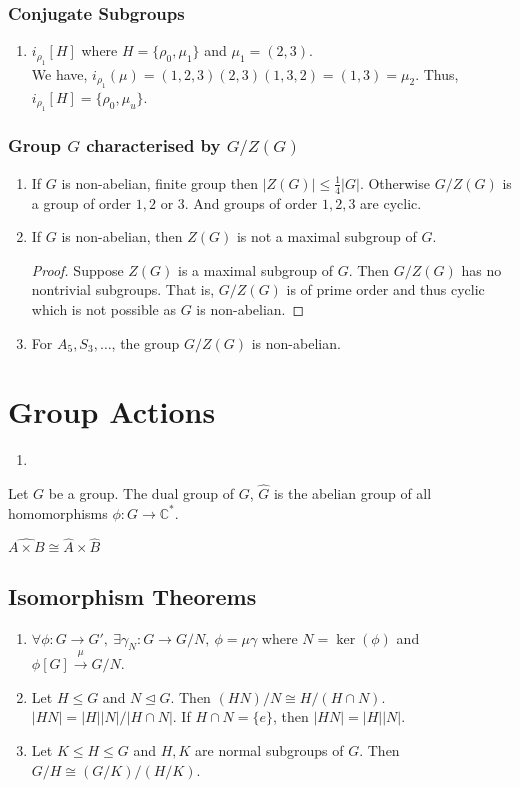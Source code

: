 \subsubsection{Conjugate Subgroups}
\begin{enumerate}
	\item $i_{\rho_1}[H]$ where $H = \{ \rho_0, \mu_1 \}$ and $\mu_1 = (2,3)$.\\
	We have, $i_{\rho_1}(\mu) = (1,2,3)(2,3)(1,3,2)=(1,3) = \mu_2$.
	Thus, $i_{\rho_1}[H] = \{ \rho_0, \mu_u \}$.
\end{enumerate}

\subsubsection{Group $G$ characterised by $G/Z(G)$}
\begin{enumerate}
	\item If $G$ is non-abelian, finite group then $|Z(G)| \le \frac{1}{4}|G|$. Otherwise $G/Z(G)$ is a group of order $1,2$ or $3$. And groups of order $1,2,3$ are cyclic.
	\item If $G$ is non-abelian, then $Z(G)$ is not a maximal subgroup of $G$.
	\begin{proof}
		Suppose $Z(G)$ is a maximal subgroup of $G$.
		Then $G/Z(G)$ has no nontrivial subgroups.
		That is, $G/Z(G)$ is of prime order and thus cyclic which is not possible as $G$ is non-abelian.
	\end{proof}
	\item For $A_5,S_3,\dots$, the group $G/Z(G)$ is non-abelian.
\end{enumerate}

\section{Group Actions}
\begin{enumerate}
	\item 
\end{enumerate}

\begin{definition}
	Let $G$ be a group. The dual group of $G$, $\hat{G}$ is the abelian group of all homomorphisms $\phi : G \to \mathbb{C}^\ast$.
\end{definition}
	$\widehat{A \times B} \cong \hat{A} \times \hat{B}$

\subsection{Isomorphism Theorems}
\begin{enumerate}
	\item $\forall \phi : G \to G',\ \exists \gamma_N : G \to G/N,\ \phi = \mu \gamma$ where $N = \ker(\phi)$ and $\phi[G] \overset{\mu}{\to} G/N$.
	\item Let $H \le G$ and $N \trianglelefteq G$. Then $(HN)/N \cong H/(H \cap N)$.
		\subitem $|HN| = |H| |N| / |H \cap N|$.
		\subitem If $H \cap N = \{ e \}$, then $|HN| = |H| |N|$.
	\item Let $K \le H \le G$ and $H,K$ are normal subgroups of $G$. Then $G/H \cong (G/K)/(H/K)$.
\end{enumerate}

